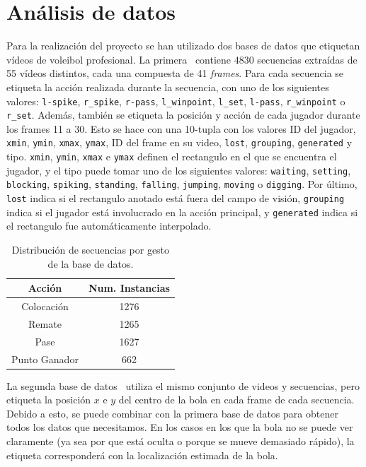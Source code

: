 \documentclass[12pt]{report} %
\begin{document}
    \chapter{Análisis de datos}
    \label{cahp:datos}
    Para la realización del proyecto se han utilizado dos bases de datos que
    etiquetan vídeos de voleibol profesional. La primera~\cite{dataset1} contiene 4830
    secuencias extraídas de 55 vídeos distintos, cada una compuesta de 41
    \textit{frames}. Para cada secuencia se etiqueta la acción realizada durante
    la secuencia, con uno de los siguientes valores: \verb!l-spike!,
    \verb!r_spike!, \verb!r-pass!, \verb!l_winpoint!, \verb!l_set!,
    \verb!l-pass!, \verb!r_winpoint! o \verb!r_set!. Además, también se etiqueta
    la posición y acción de cada jugador durante los frames 11 a 30. Esto se
    hace con una 10-tupla con los valores ID del jugador, \verb!xmin!,
    \verb!ymin!, \verb!xmax!, \verb!ymax!, ID del frame en su video,
    \verb!lost!, \verb!grouping!, \verb!generated! y tipo. \verb!xmin!,
    \verb!ymin!, \verb!xmax! e \verb!ymax! definen el rectangulo en el que se
    encuentra el jugador, y el tipo puede tomar uno de los siguientes valores:
    \verb!waiting!, \verb!setting!, \verb!blocking!, \verb!spiking!,
    \verb!standing!, \verb!falling!, \verb!jumping!, \verb!moving! o
    \verb!digging!. Por último, \verb!lost! indica si el rectangulo anotado está
    fuera del campo de visión, \verb!grouping! indica si el jugador está
    involucrado en la acción principal, y \verb!generated! indica si el
    rectangulo fue automáticamente interpolado.

    \begin{table}[H]
        \begin{tabular}{@{}cc@{}}
            \toprule
            Acción & Num. Instancias\\
            \midrule
            Colocación    & 1276\\
            Remate        & 1265\\
            Pase          & 1627\\
            Punto Ganador &  662\\
            \bottomrule
        \end{tabular}
        \caption{Distribución de secuencias por gesto de la base de datos.}
    \end{table}

    La segunda base de datos~\cite{dataset2} utiliza el mismo conjunto de videos y secuencias,
    pero etiqueta la posición $x$ e $y$ del centro de la bola en cada frame de
    cada secuencia. Debido a esto, se puede combinar con la primera base de
    datos para obtener todos los datos que necesitamos. En los casos en los que
    la bola no se puede ver claramente (ya sea por que está oculta o porque se
    mueve demasiado rápido), la etiqueta corresponderá con la localización
    estimada de la bola.
\end{document}
